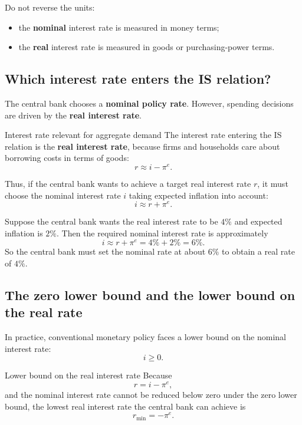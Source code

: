 \begin{commonmistake}
Do not reverse the units:
\begin{itemize}[leftmargin=1.5em]
    \item the \textbf{nominal} interest rate is measured in money terms;
    \item the \textbf{real} interest rate is measured in goods or purchasing-power terms.
\end{itemize}
\end{commonmistake}

\subsection{Which interest rate enters the IS relation?}

The central bank chooses a \textbf{nominal policy rate}. However, spending decisions are driven by the \textbf{real interest rate}.

\begin{definition}{Interest rate relevant for aggregate demand}{}
The interest rate entering the IS relation is the \textbf{real interest rate}, because firms and households care about borrowing costs in terms of goods:
\[
r \approx i - \pi^e.
\]
\end{definition}

\noindent
Thus, if the central bank wants to achieve a target real interest rate $r$, it must choose the nominal interest rate $i$ taking expected inflation into account:
\[
i \approx r + \pi^e.
\]

\begin{examplebox}[title={Worked Example: Real versus nominal rate}]
Suppose the central bank wants the real interest rate to be $4\%$ and expected inflation is $2\%$. Then the required nominal interest rate is approximately
\[
i \approx r+\pi^e = 4\%+2\% = 6\%.
\]
So the central bank must set the nominal rate at about $6\%$ to obtain a real rate of $4\%$.
\end{examplebox}

\subsection{The zero lower bound and the lower bound on the real rate}

In practice, conventional monetary policy faces a lower bound on the nominal interest rate:
\[
i \ge 0.
\]

\begin{theorem}{Lower bound on the real interest rate}{}
Because
\[
r = i-\pi^e,
\]
and the nominal interest rate cannot be reduced below zero under the zero lower bound,
the lowest real interest rate the central bank can achieve is
\[
r_{\min} = -\pi^e.
\]
\end{theorem}

